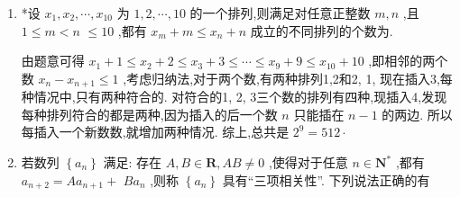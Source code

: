 \begin{enumerate}
\begin{jieda}
        经检验$n = 3$或$9$时，$a = b$，故$11+33+99 = 143$
    \end{jieda}
    \item *设 ${x}_{1},{x}_{2},\cdots ,{x}_{10}$ 为 $1,2,\cdots ,{10}$ 的一个排列,则满足对任意正整数 $m,n$ ,且 $1 \leq  m < n$  $\leq  {10}$ ,都有 ${x}_{m} + m \leq  {x}_{n} + n$ 成立的不同排列的个数为.
    \begin{jieda}
        由题意可得 ${x}_{1} + 1 \leq  {x}_{2} + 2 \leq  {x}_{3} + 3 \leq  \cdots  \leq  {x}_{9} + 9 \leq  {x}_{10} + {10}$ ,即相邻的两个数 ${x}_{n} - {x}_{n + 1} \leq  1$ ,考虑归纳法,对于两个数,有两种排列1,2和2, 1, 现在插入3,每种情况中,只有两种符合的. 对符合的1, 2, 3三个数的排列有四种,现插入4,发现每种排列符合的都是两种,因为插入的后一个数 ${n}$ 只能插在 ${n} - 1$ 的两边. 所以每插入一个新数数,就增加两种情况. 综上,总共是 ${2}^{9} = {512} \cdot$
    \end{jieda}
    \item 若数列 $\left\{  {a}_{n}\right\}$ 满足: 存在 $A,B \in  \mathbf{R},{AB} \neq  0$ ,使得对于任意 $n \in  {\mathbf{N}}^{ * }$ ,都有 ${a}_{n + 2} = A{a}_{n + 1} +$  $B{a}_{n}$ ,则称 $\left\{  {a}_{n}\right\}$ 具有“三项相关性”. 下列说法正确的有
    \begin{jieda}
\end{jieda}
\end{enumerate}
